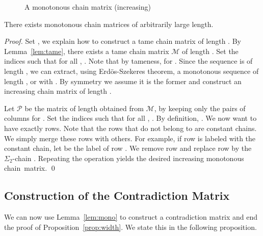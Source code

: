 \documentclass[envcountsame]{llncs}
\newcommand\mat{\ensuremath{\mathscr{M}}\xspace}
\newcommand\pat{\ensuremath{\mathscr{P}}\xspace}
\newcommand{\sic}[1]{\ensuremath{\Sigma_{#1}}\xspace}
\newcommand\chain{chain\xspace}
\newcommand\qchain[1]{\ensuremath{\sic{#1}}-chain\xspace}
\newcommand\dchain{\qchain{2}}
\begin{document}
\begin{figure}[h]
\begin{center}
  \end{center}
  \caption{A monotonous \chain matrix (increasing)}
  \label{fig:inctame}
\end{figure}

\begin{lemma} \label{lem:mono}
  There exists monotonous \chain matrices of arbitrarily large length.
\end{lemma}

\begin{proof}
  Set , we explain how to construct a tame \chain matrix of
  length . By Lemma~\ref{lem:tame}, there exists a tame \chain matrix
  \mat of length . Set  the indices such that
  for all , . Note that by tameness,  for . Since the sequence 
  is of length , we can extract, using Erd\"os-Szekeres theorem, a
  monotonous sequence of length ,  or
   with .  By symmetry
  we assume it is the former and construct an increasing \chain matrix
  of length .

  Let \pat be the matrix of length  obtained from \mat, by keeping
  only the pairs of columns  for . Set
   the indices such that for all , . By definition, . We now want
   to have exactly  rows. Note that the rows  that do not belong to
   are constant chains. We simply merge these rows
  with others. For example, if row  is labeled with the 
  constant \chain , let  be the label of
  row . We remove row  and replace row  by the \dchain
  . Repeating the operation yields the desired increasing
  monotonous \chain~matrix. \qed
\end{proof}


\subsection{Construction of the Contradiction Matrix}  

We can now use Lemma~\ref{lem:mono} to construct a contradiction
matrix and end the proof of Proposition~\ref{prop:width}. We state
this in the following proposition.
\end{document}
